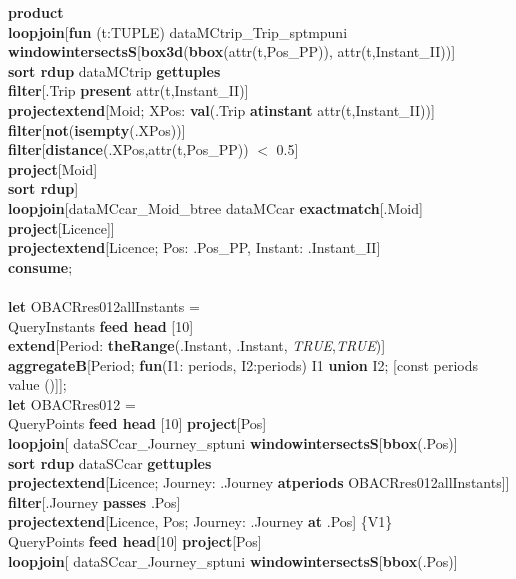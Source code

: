 \documentclass[a4paper]{article}
\newcommand{\op}[1]{\textbf{#1}}
\newcommand{\true}{\textsl{TRUE}}
\begin{document}
\begin{scriptsize}
\begin{tabbing}
\>\op{product}\\
\>\op{loopjoin}[\op{fun} (t:TUPLE) dataMCtrip\_Trip\_sptmpuni \op{windowintersectsS}[\op{box3d}(\op{bbox}(attr(t,Pos\_PP)),                       attr(t,Instant\_II))]\\
\>\>\op{sort rdup} dataMCtrip \op{gettuples}\\
\>\>\op{filter}[.Trip \op{present} attr(t,Instant\_II)]\\
\>\>\op{projectextend}[Moid; XPos: \op{val}(.Trip \op{atinstant} attr(t,Instant\_II))]\\
\>\>\op{filter}[\op{not}(\op{isempty}(.XPos))]\\
\>\>\op{filter}[\op{distance}(.XPos,attr(t,Pos\_PP)) $<$ 0.5]\\
\>\>\op{project}[Moid]\\
\>\>\op{sort rdup}]\\
\>\op{loopjoin}[dataMCcar\_Moid\_btree dataMCcar \op{exactmatch}[.Moid]\\
\>\>\op{project}[Licence]]\\
\>\op{projectextend}[Licence; Pos: .Pos\_PP, Instant: .Instant\_II]\\
\op{consume};\\
\\
\op{let} OBACRres012allInstants =\\
\>QueryInstants \op{feed head} [10]\\
\>\op{extend}[Period: \op{theRange}(.Instant, .Instant, \true{},\true{})]\\
\>\op{aggregateB}[Period; \op{fun}(I1: periods, I2:periods) I1 \op{union} I2; [const periods value ()]];\\
\op{let} OBACRres012 =\\
\>QueryPoints \op{feed head} [10] \op{project}[Pos]\\
\>\>\op{loopjoin}[ dataSCcar\_Journey\_sptuni \op{windowintersectsS}[\op{bbox}(.Pos)]\\
\>\>\>\op{sort rdup} dataSCcar \op{gettuples}\\
\>\>\>\op{projectextend}[Licence; Journey: .Journey \op{atperiods} OBACRres012allInstants]]\\
\>\>\op{filter}[.Journey \op{passes} .Pos]\\
\>\>\op{projectextend}[Licence, Pos; Journey: .Journey \op{at} .Pos] \{V1\}\\
\>QueryPoints \op{feed head}[10] \op{project}[Pos]\\
\>\>\op{loopjoin}[ dataSCcar\_Journey\_sptuni \op{windowintersectsS}[\op{bbox}(.Pos)]\\

\end{tabbing}
\end{scriptsize}
\end{document}
